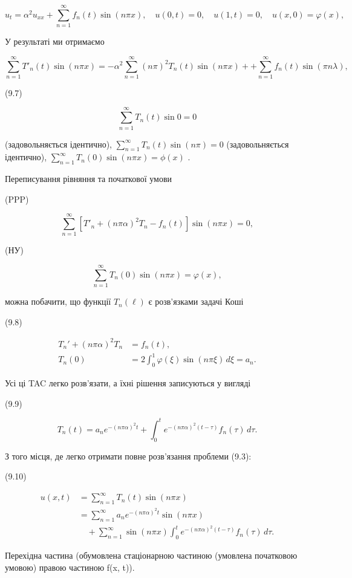 \documentclass[
  ukrainian,
]{article}
\begin{document}
\[
u_{t} = \alpha^{2} u_{xx} + \sum_{n=1}^{\infty} f_{n}(t) \sin(n\pi x),
\quad u(0, t) = 0, \quad u(1, t) = 0, \quad u(x, 0) = \varphi(x),
\]

У результаті ми отримаємо

\[
\sum_{n=1}^{\infty} T'_n(t) \sin(n\pi x) = -\alpha^2 \sum_{n=1}^{\infty} (n\pi)^2 T_n(t) \sin(n\pi x) + + \sum_{n=1}^{\infty} f_n(t) \sin(\pi n\lambda),
\]

(9.7)

\[
\sum_{n=1}^{\infty} T_n(t) \sin 0 = 0
\]

(задовольняється ідентично),
\(\sum_{n=1}^{\infty} T_n(t) \sin (n\pi) = 0\) (задовольняється
ідентично), \(\sum_{n=1}^{\infty} T_n(0) \sin (n\pi x) = \phi(x)\) .

Переписування рівняння та початкової умови

(PPP)

\[
\sum_{n=1}^{\infty} [T'_n + (n\pi\alpha)^2 T_n - f_n(t)] \sin(n\pi x) = 0,
\]

(НУ)

\[
\sum_{n=1}^{\infty} T_n(0) \sin(n\pi x) = \varphi(x),
\]

можна побачити, що функції \(T_n(\ell)\) є розв'язками задачі Коші

(9.8)

\[
\begin{aligned}
T_n' + (n\pi\alpha)^2 T_n &= f_n(t), \\
T_n(0) &= 2 \int_0^1 \varphi(\xi)\sin(n\pi \xi)\,d\xi = a_n.
\end{aligned}
\]

Усі ці TAC легко розв'язати, а їхні рішення записуються у вигляді

(9.9)

\[
T_n(t) = a_n e^{-(n\pi\alpha)^2 t} + \int_0^t e^{-(n\pi\alpha)^2 (t-\tau)} f_n(\tau)\,d\tau.
\]

З того місця, де легко отримати повне розв'язання проблеми (9.3):

(9.10)

\[
\begin{aligned}
u(x, t) &= \sum_{n=1}^{\infty} T_n(t)\sin(n\pi x) \\
&= \sum_{n=1}^{\infty} a_n e^{-(n\pi\alpha)^2 t}\sin(n\pi x) \\
&\quad + \sum_{n=1}^{\infty} \sin(n\pi x)\int_0^t e^{-(n\pi\alpha)^2 (t-\tau)} f_n(\tau)\,d\tau.
\end{aligned}
\]

Перехідна частина (обумовлена стаціонарною частиною (умовлена початковою
умовою) правою частиною f(x, t)).
\end{document}
